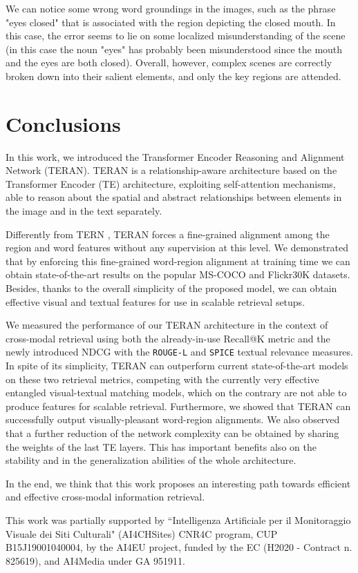 \documentclass[acmsmall]{acmart}
\newcommand{\majorrevised}[1]{#1}
\begin{document}
We can notice some wrong word groundings in the images, such as the phrase "eyes closed" that is associated with the region depicting the closed mouth. In this case, the error seems to lie on some localized misunderstanding of the scene (in this case the noun "eyes" has probably been misunderstood since the mouth and the eyes are both closed).
Overall, however, complex scenes are correctly broken down into their salient elements, and only the key regions are attended.

\section{Conclusions}
In this work, we introduced the Transformer Encoder Reasoning and Alignment Network (TERAN). TERAN is a relationship-aware architecture based on the Transformer Encoder (TE) architecture, exploiting self-attention mechanisms, able to reason about the spatial and abstract relationships between elements in the image and in the text separately. 

Differently from TERN \cite{messina2020tern}, TERAN forces a fine-grained alignment among the region and word features without any supervision at this level.
We demonstrated that by enforcing this fine-grained word-region alignment at training time we can obtain state-of-the-art results on the popular MS-COCO and Flickr30K datasets. \majorrevised{Besides, thanks to the overall simplicity of the proposed model, we can obtain effective visual and textual features for use in scalable retrieval setups.}









We measured the performance of our TERAN architecture in the context of cross-modal retrieval using both the already-in-use Recall@K metric and the newly introduced NDCG with the \texttt{ROUGE-L} and \texttt{SPICE} textual relevance measures.
\majorrevised{In spite of its simplicity, TERAN can outperform current state-of-the-art models on these two retrieval metrics, competing with the currently very effective entangled visual-textual matching models, which on the contrary are not able to produce features for scalable retrieval. Furthermore, we showed that TERAN can successfully output visually-pleasant word-region alignments.}
We also observed that a further reduction of the network complexity can be obtained by sharing the weights of the last TE layers. This has important benefits also on the stability and in the generalization abilities of the whole architecture.

In the end, we think that this work proposes an interesting path towards efficient and effective cross-modal information retrieval.



\begin{acks}
This work was partially supported by “Intelligenza Artificiale per il Monitoraggio Visuale dei Siti Culturali" (AI4CHSites) CNR4C program,
CUP B15J19001040004, by the AI4EU project,
funded by the EC (H2020 - Contract n. 825619), and AI4Media under GA 951911.
\end{acks}



\end{document}
